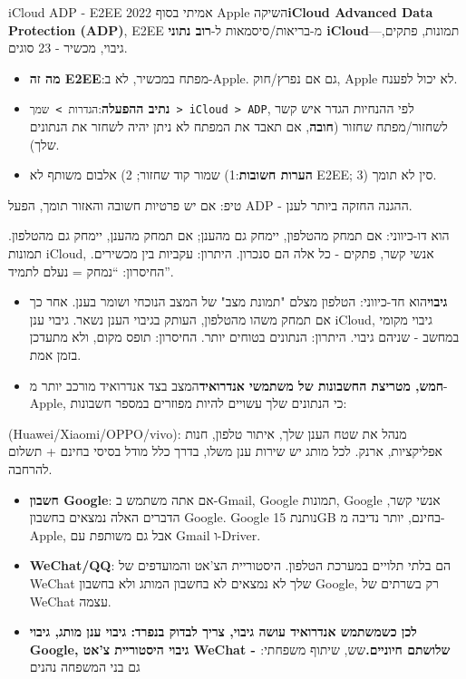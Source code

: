 \begin{tcbwarn}{iCloud ADP - E2EE אמיתי}
בסוף 2022 Apple השיקה\textbf{iCloud Advanced Data Protection (ADP)}, E2EE מ-בריאות/סיסמאות ל-\textbf{רוב נתוני iCloud}—תמונות, פתקים, גיבוי, מכשיר - 23 סוגים.

\begin{itemize}
  \item \textbf{מה זה E2EE}:מפתח במכשיר, לא ב-Apple. גם אם נפרץ/חוק, Apple לא יכול לפענח.
  \item \textbf{נתיב ההפעלה}:\texttt{הגדרות > שמך > iCloud > ADP}, לפי ההנחיות הגדר איש קשר לשחזור/מפתח שחזור (\textbf{חובה}, אם תאבד את המפתח לא ניתן יהיה לשחזר את הנתונים שלך).
  \item \textbf{הערות חשובות}:1) שמור קוד שחזור; 2) אלבום משותף לא E2EE; 3) סין לא תומך.
\end{itemize}

טיפ: אם יש פרטיות חשובה והאזור תומך, הפעל ADP - ההגנה החזקה ביותר לענן.

\end{tcbwarn}


הוא דו-כיווני: אם תמחק מהטלפון, יימחק גם מהענן; אם תמחק מהענן, יימחק גם מהטלפון. תמונות iCloud, אנשי קשר, פתקים - כל אלה הם סנכרון. היתרון: עקביות בין מכשירים. החיסרון: “נמחק = נעלם לתמיד”.

\begin{itemize}
  \item \textbf{גיבוי}הוא חד-כיווני: הטלפון מצלם "תמונת מצב" של המצב הנוכחי ושומר בענן. אחר כך אם תמחק משהו מהטלפון, העותק בגיבוי הענן נשאר. גיבוי ענן iCloud, גיבוי מקומי במחשב - שניהם גיבוי. היתרון: הנתונים בטוחים יותר. החיסרון: תופס מקום, ולא מתעדכן בזמן אמת.
  \item \textbf{חמש, מטריצת החשבונות של משתמשי אנדרואיד}המצב בצד אנדרואיד מורכב יותר מ-Apple, כי הנתונים שלך עשויים להיות מפוזרים במספר חשבונות:
\end{itemize}


(Huawei/Xiaomi/OPPO/vivo): מנהל את שטח הענן שלך, איתור טלפון, חנות אפליקציות, ארנק. לכל מותג יש שירות ענן משלו, בדרך כלל מודל בסיסי בחינם + תשלום להרחבה.

\begin{itemize}
  \item \textbf{חשבון Google}: אם אתה משתמש ב-Gmail, Google תמונות, Google אנשי קשר, הדברים האלה נמצאים בחשבון Google. Google נותנת 15GB בחינם, יותר נדיבה מ-Apple, אבל גם משותפת עם Gmail ו-Driver.
  \item \textbf{WeChat/QQ}: הם בלתי תלויים במערכת הטלפון. היסטוריית הצ'אט והמועדפים של WeChat שלך לא נמצאים לא בחשבון המותג ולא בחשבון Google, רק בשרתים של WeChat עצמה.
  \item \textbf{לכן כשמשתמש אנדרואיד עושה גיבוי, צריך לבדוק בנפרד: גיבוי ענן מותג, גיבוי Google, גיבוי היסטוריית צ'אט WeChat - שלושתם חיוניים.}שש, שיתוף משפחתי: גם בני המשפחה נהנים
\end{itemize}

